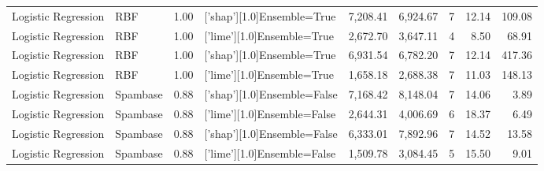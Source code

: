 \begin{tabular}{llrlrrlrr}
Logistic Regression &      RBF &      1.00 &  ['shap'][1.0]Ensemble=True &   7,208.41 &                 6,924.67 &               7 &              12.14 & 109.08 \\
Logistic Regression &      RBF &      1.00 &  ['lime'][1.0]Ensemble=True &   2,672.70 &                 3,647.11 &               4 &               8.50 &  68.91 \\
Logistic Regression &      RBF &      1.00 &  ['shap'][1.0]Ensemble=True &   6,931.54 &                 6,782.20 &               7 &              12.14 & 417.36 \\
Logistic Regression &      RBF &      1.00 &  ['lime'][1.0]Ensemble=True &   1,658.18 &                 2,688.38 &               7 &              11.03 & 148.13 \\
Logistic Regression & Spambase &      0.88 & ['shap'][1.0]Ensemble=False &   7,168.42 &                 8,148.04 &               7 &              14.06 &   3.89 \\
Logistic Regression & Spambase &      0.88 & ['lime'][1.0]Ensemble=False &   2,644.31 &                 4,006.69 &               6 &              18.37 &   6.49 \\
Logistic Regression & Spambase &      0.88 & ['shap'][1.0]Ensemble=False &   6,333.01 &                 7,892.96 &               7 &              14.52 &  13.58 \\
Logistic Regression & Spambase &      0.88 & ['lime'][1.0]Ensemble=False &   1,509.78 &                 3,084.45 &               5 &              15.50 &   9.01 \\
\bottomrule
\end{tabular}
